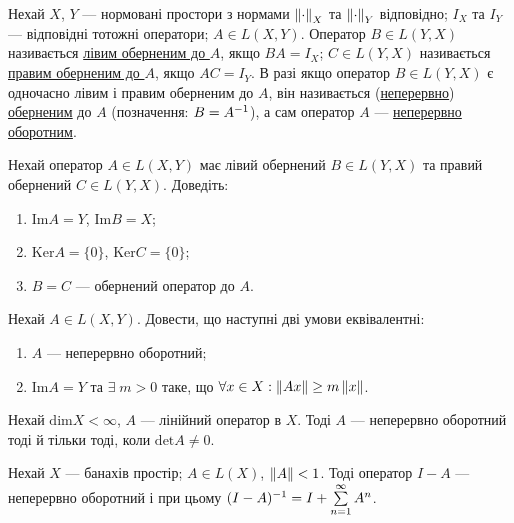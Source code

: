 
\begin{theory}
    Нехай $X$, $Y$ --- нормовані простори з нормами $\left\lVert\cdot\right\rVert_X$ та 
    $\left\lVert\cdot\right\rVert_Y$ відповідно; $I_X$ та $I_Y$ --- відповідні тотожні 
    оператори; $A \in L(X, Y)$. Оператор $B \in L(Y, X)$ називається 
    \ul{лівим оберненим до $A$}, якщо $BA = I_X$; $C \in L(Y, X)$ 
    називається \ul{правим оберненим до $A$}, якщо $AC = I_Y$. В разі якщо оператор 
    $B \in L(Y, X)$ є одночасно лівим і правим оберненим до $A$, він називається 
    (\ul{неперервно}) \ul{оберненим} до $A$ (позначення: $B = A^{-1}$), 
    а сам оператор $A$ --- \ul{неперервно оборотним}.
\end{theory}

\begin{exercise}
    Нехай оператор $A \in L(X, Y)$ має лівий обернений $B \in L(Y, X)$ та правий обернений 
    $C \in L(Y, X)$. Доведіть: 
    \begin{enumerate}
        \item $\mathrm{Im} A = Y$, $\mathrm{Im} B = X$;
        \item $\mathrm{Ker} A = \{0\}$, $\mathrm{Ker} C = \{0\}$;
        \item $B = C$ --- обернений оператор до $A$.
    \end{enumerate}
\end{exercise}

\begin{exercise}
    Нехай $A \in L(X, Y)$. Довести, що наступні дві умови еквівалентні:
    \begin{enumerate}
        \item $A$ --- неперервно оборотний;
        \item $\mathrm{Im} A = Y$ та $\exists \; m > 0$ таке, що $\forall x \in X:\left\lVert Ax\right\rVert \geq m \left\lVert x\right\rVert$. 
    \end{enumerate}
\end{exercise}

\begin{exercise}
    Нехай $\mathrm{dim} X < \infty$, $A$ --- лінійний оператор в $X$. Тоді $A$ --- неперервно оборотний 
    тоді й тільки тоді, коли $\mathrm{det} A \neq 0$.
\end{exercise}

\begin{exercise}
    Нехай $X$ --- банахів простір; $A \in L(X)$, $\left\lVert A\right\rVert < 1$. Тоді оператор $I-A$ --- 
    неперервно оборотний і при цьому $(I-A)^{-1} = I + \sum\limits_{n=1}^\infty A^n$.
\end{exercise}

